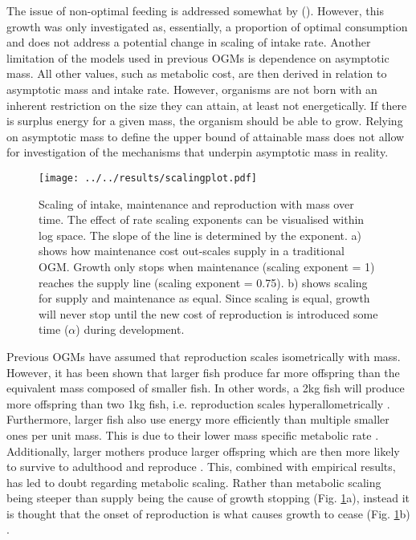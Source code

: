 \documentclass[a4paper, 11pt, hidelinks]{article} %
\begin{document}
	The issue of non-optimal feeding is addressed somewhat by \citeauthor{Hou2011} (\citeyear{Hou2011}).  However, this growth was only investigated as, essentially, a proportion of optimal consumption and does not address a potential change in scaling of intake rate.
	Another limitation of the models used in previous OGMs is dependence on asymptotic mass.  
	All other values, such as metabolic cost, are then derived in relation to asymptotic mass and intake rate.  However, organisms are not born with an inherent restriction on the size they can attain, at least not energetically.  If there is surplus energy for a given mass, the organism should be able to grow.  Relying on asymptotic mass to define the upper bound of attainable mass does not allow for investigation of the mechanisms that underpin asymptotic mass in reality. 
	\begin{figure}[h!]
		\centering
		\texttt{[image: ../../results/scalingplot.pdf]}
		\caption{Scaling of intake, maintenance and reproduction with mass over time.  The effect of rate scaling exponents can be visualised within log space.  The slope of the line is determined by the exponent.  a) shows how maintenance cost out-scales supply in a traditional OGM.  Growth only stops when maintenance (scaling exponent = 1) reaches the supply line (scaling exponent = 0.75).  b) shows scaling for supply and maintenance as equal. Since scaling is equal, growth will never stop until the new cost of reproduction is introduced some time ($\alpha$) during development.}
		\label{scaling_plot}
	\end{figure}
	
	Previous OGMs have assumed that reproduction scales isometrically with mass.  
	However, it has been shown that larger fish produce far more offspring than the equivalent mass composed of smaller fish.  In other words, a 2kg fish will produce more offspring than two 1kg fish, i.e. reproduction scales hyperallometrically \parencite{Barneche2018}.
	Furthermore, larger fish also use energy more efficiently than multiple smaller ones per unit mass.  This is due to their lower mass specific metabolic rate \parencite{Peters1983, Kleiber1932, Brown2004}.  
	Additionally, larger mothers produce larger offspring which are then more likely to survive to adulthood and reproduce \parencite{Hixon2014, Marshall2006}. 
	This, combined with empirical results, has led to doubt regarding metabolic scaling.  Rather than metabolic scaling being steeper than supply being the cause of growth stopping (Fig. \ref{scaling_plot}a), instead it is thought that the onset of reproduction is what causes growth to cease (Fig. \ref{scaling_plot}b) \parencite{Marshall2019, Sibly2020}.
	
\end{document}
